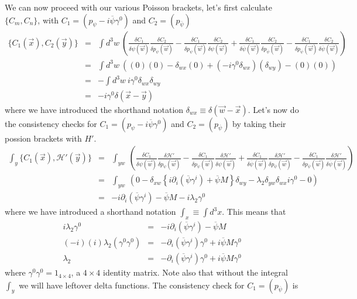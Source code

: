 \documentclass[aps,preprint,preprintnumbers,nofootinbib,showpacs,prd]{revtex4-1}
\newcommand{\nbea}{\begin{eqnarray*}}
\newcommand{\neea}{\end{eqnarray*}}
\begin{document}
We can now proceed with our various Poisson brackets, let's first calculate $\{C_m, C_n\}$, with $C_1 = (p_\psi - i \overline \psi \gamma^0) $ and $C_2 = (p_{\overline \psi})$ 
%
\nbea
\{C_1(\vec x), C_2(\vec y) \} & = & \int d^3w~ \left ( \frac{\delta C_1}{\delta \psi(\vec w)} \frac{\delta C_2}{\delta p_\psi(\vec w)} - \frac{\delta C_1}{\delta p_\psi(\vec w)} \frac{\delta C_2}{\delta \psi(\vec w)}  + \frac{\delta C_1}{\delta \overline \psi(\vec w)} \frac{\delta C_2}{\delta p_{\overline \psi}(\vec w)} - \frac{\delta C_1}{\delta p_{\overline\psi}(\vec w)} \frac{\delta C_2}{\delta \overline \psi(\vec w)} \right ) \\
& = & \int d^3w~ \left ( (0) (0) - \delta_{wx} (0) + (- i \gamma^0 \delta_{wx})(\delta_{wy}) - (0)(0) \right ) \\
& = &  -\int d^3w~ i \gamma^0 \delta_{wx}\delta_{wy} \\
& = & - i \gamma^0 \delta(\vec x - \vec y)
\neea
%
where we have introduced the shorthand notation $\delta_{wx} \equiv \delta(\vec w - \vec x)$. Let's now do the consistency checks for $C_1 = (p_\psi - i \overline \psi \gamma^0) $ and $C_2 = (p_{\overline \psi})$ by taking their possion brackets with $H'$.
%
\nbea
\int_{y}\{C_1(\vec x), \mathcal{H}'(\vec y) \} & = & \int_{yw}~ \left ( \frac{\delta C_1}{\delta \psi(\vec w)} \frac{\delta \mathcal{H}'}{\delta p_\psi(\vec w)} - \frac{\delta C_1}{\delta p_\psi(\vec w)} \frac{\delta \mathcal{H}'}{\delta \psi(\vec w)}  + \frac{\delta C_1}{\delta \overline \psi(\vec w)} \frac{\delta \mathcal{H}'}{\delta p_{\overline \psi}(\vec w)} - \frac{\delta C_1}{\delta p_{\overline\psi}(\vec w)} \frac{\delta \mathcal{H}'}{\delta \overline \psi(\vec w)} \right ) \\
& = & \int_{yw}~ \left ( 0 - \delta_{xw} \left \{ i \partial_{i}(\overline \psi \gamma^{i}) + \overline \psi M \right \}\delta_{wy} - \lambda_2 \delta_{yw}\delta_{wx} i \gamma^0 - 0 \right ) \\
& = & - i \partial_{i}(\overline \psi \gamma^{i}) -\overline \psi M - i \lambda_2 \gamma^0
\neea
%
where we have introduced a shorthand notation $\int_x \equiv \int d^3x$. This means that
%
\nbea
i \lambda_2 \gamma^0 & = & - i \partial_{i}(\overline \psi \gamma^{i}) -\overline \psi M \\
(-i)(i) \lambda_2 (\gamma^0 \gamma^0) & = & - \partial_{i}(\overline \psi \gamma^{i})\gamma^0 + i \overline \psi M \gamma^0 \\
\lambda_2 & = & - \partial_{i}(\overline \psi \gamma^{i})\gamma^0 + i \overline \psi M \gamma^0
\neea
%
where $\gamma^0 \gamma^0 = 1_{4\times 4}$, a $4\times 4$ identity matrix. Note also that without the integral $\int_y$ we will have leftover delta functions. The consistency check for $C_1 = (p_{\overline\psi})$ is
\end{document}
